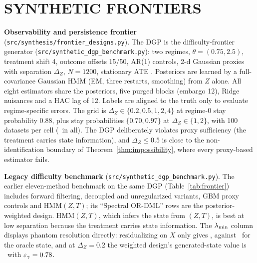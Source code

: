 \section{SYNTHETIC FRONTIERS}
\label{app:frontiers}
\textbf{Observability and persistence frontier} (\texttt{src/synthesis/frontier\_designs.py}). The DGP is the difficulty-frontier generator (\texttt{src/synthetic\_dgp\_benchmark.py}): two regimes, $\theta=(0.75,2.5)$, treatment shift 4, outcome offsets 15/50, AR(1) controls, 2-d Gaussian proxies with separation $\Delta_Z$, $N=1200$, stationary ATE \FDTrueATE. Posteriors are learned by a full-covariance Gaussian HMM (EM, three restarts, smoothing) from $Z$ alone. All eight estimators share the posteriors, five purged blocks (embargo 12), Ridge nuisances and a HAC lag of 12. Labels are aligned to the truth only to evaluate regime-specific errors. The grid is $\Delta_Z\in\{0.2,0.5,1,2,4\}$ at regime-0 stay probability 0.88, plus stay probabilities $\{0.70,0.97\}$ at $\Delta_Z\in\{1,2\}$, with 100 datasets per cell (\FDNRuns\ in all). The DGP deliberately violates proxy sufficiency (the treatment carries state information), and $\Delta_Z\le0.5$ is close to the non-identification boundary of Theorem~\ref{thm:impossibility}, where every proxy-based estimator fails.
\begin{table}[h]\centering\scriptsize\setlength{\tabcolsep}{3pt}
\caption{Observability $\times$ persistence frontier, all estimators (\texttt{reports/synthesis/}\allowbreak\texttt{frontier\_designs\_summary.csv}). Coverage: nominal 95\% intervals for the sample ATE. $\|\hat\bth-\bth^*\|$: median over datasets. $\lmin$: generated-state Gram matrix (median).}\label{tab:fd}

\end{table}
\begin{table}[h]\centering\footnotesize
\caption{Persistence: mean absolute ATE bias by regime-0 stay probability $p_{00}$ (\texttt{reports/synthesis/frontier\_designs\_summary.csv}).}\label{tab:fc}

\end{table}
\textbf{Legacy difficulty benchmark} (\texttt{src/synthetic\_dgp\_benchmark.py}). The earlier eleven-method benchmark on the same DGP (Table~\ref{tab:frontier}) includes forward filtering, decoupled and unregularized variants, GBM proxy controls and HMM$(Z,T)$; its ``Spectral OR-DML'' rows are the posterior-weighted design. HMM$(Z,T)$, which infers the state from $(Z,T)$, is best at low separation because the treatment carries state information. The $\lmin$ column displays phantom resolution directly: residualizing on $X$ only gives \BMLamStd, against \BMLamOracle\ for the oracle state, and at $\Delta_Z=0.2$ the weighted design's generated-state value is \BMLamSoftLow\ with $\varepsilon_\gamma=0.78$.
